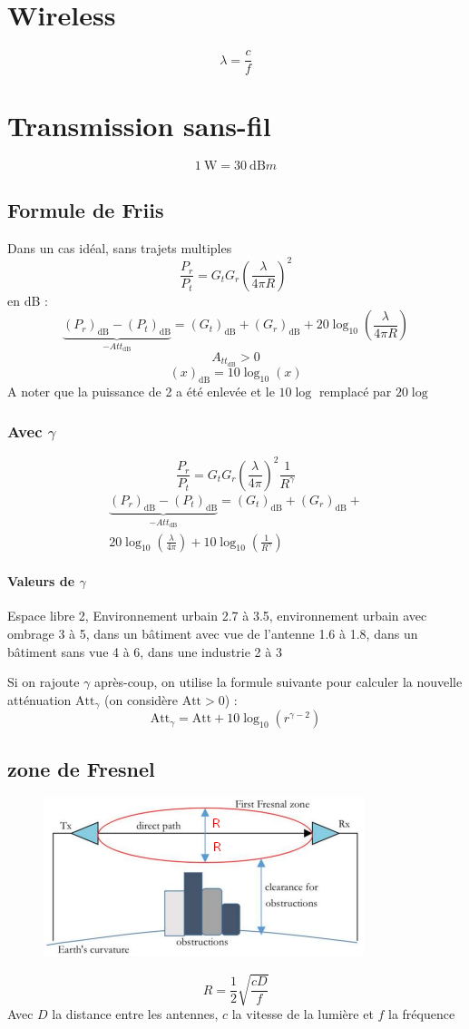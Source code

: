 \documentclass[resume]{subfiles}
\begin{document}
\section{Wireless}
$$\boxed{\lambda=\frac{c}{f}}$$
\section{Transmission sans-fil}
$$\SI{1}{\watt}=\SI{30}{\deci\bel m}$$
\subsection{Formule de Friis}
Dans un cas idéal, sans trajets multiples
$$\frac{P_r}{P_t}=G_tG_r\left(\frac{\lambda}{4\pi R}\right)^2$$
en \si{\deci\bel} : 
$$\underbrace{(P_r)_{\si{\deci\bel}}-(P_t)_{\si{\deci\bel}}}_{-Att_{\si{\deci\bel}}}=(G_t)_{\si{\deci\bel}}+(G_r)_{\si{\deci\bel}}+20\log_{10}\left(\frac{\lambda}{4\pi R}\right)$$
$$A_{tt_{\si{\deci\bel}}}>0$$
$$(x)_{\si{\deci\bel}}=10\log_{10}(x)$$
A noter que la puissance de 2 a été enlevée et le $10\log$ remplacé par $20\log$
\subsubsection{Avec $\gamma$}
$$\frac{P_r}{P_t}=G_tG_r\left(\frac{\lambda}{4\pi}\right)^2\frac{1}{R^\gamma}$$
\begin{multline*}
\underbrace{(P_r)_{\si{\deci\bel}}-(P_t)_{\si{\deci\bel}}}_{-Att_{\si{\deci\bel}}}=(G_t)_{\si{\deci\bel}}+(G_r)_{\si{\deci\bel}}+\\20\log_{10}\left(\frac{\lambda}{4\pi}\right)+10\log_{10}\left(\frac{1}{R^{\gamma}}\right)
\end{multline*}
\paragraph{Valeurs de $\gamma$} Espace libre 2, Environnement urbain 2.7 à 3.5, environnement urbain avec ombrage 3 à 5, dans un bâtiment avec vue de l'antenne 1.6 à 1.8, dans un bâtiment sans vue 4 à 6, dans une industrie 2 à 3

Si on rajoute $\gamma$ après-coup, on utilise la formule suivante pour calculer la nouvelle atténuation $\text{Att}_\gamma$ (on considère $\text{Att}>0$) :
$$\text{Att}_\gamma = \text{Att}+10\log_{10}(r^{\gamma-2})$$
\subsection{zone de Fresnel}
\begin{figure}[H]
\centering
\includegraphics[width=0.5\columnwidth]{img_0.png}
\end{figure}
$$R=\frac{1}{2}\sqrt{\frac{cD}{f}}$$
Avec $D$ la distance entre les antennes, $c$ la vitesse de la lumière et $f$ la fréquence
\end{document}
